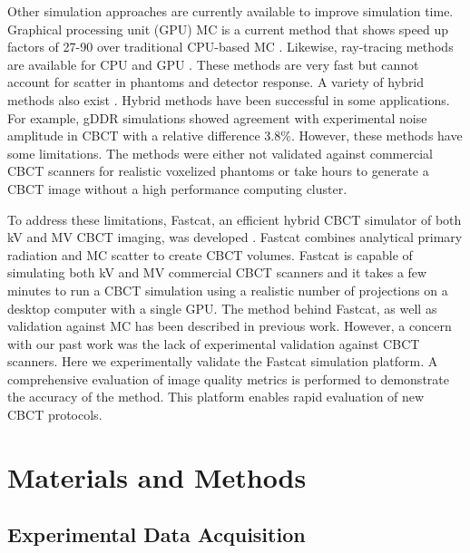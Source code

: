 Other simulation approaches are currently available to improve simulation time. Graphical processing unit (GPU) MC is a current method that shows speed up factors of 27-90 over traditional CPU-based MC \cite{Bert2013Geant4-basedApplications,Badal2009AcceleratingUnit}. Likewise, ray-tracing methods are available for CPU and GPU \cite{vanderHeyden2018VOXSI:Imaging,Landry2013ImaSimRadiology}. These methods are very fast but cannot account for scatter in phantoms and detector response. A variety of hybrid methods also exist \cite{Jia2012AProjections,DeMan2007CatSim:Environment,Li2008AImaging,Abadi2019DukeSim:Tomography}. Hybrid methods have been successful in some applications. For example, gDDR simulations \cite{Jia2012AProjections} showed agreement with experimental noise amplitude in CBCT with a relative difference 3.8\%. However, these methods have some limitations. The methods were either not validated against commercial CBCT scanners for realistic voxelized phantoms or take hours to generate a CBCT image without a high performance computing cluster.

To address these limitations, Fastcat, an efficient hybrid CBCT simulator of both kV and MV CBCT imaging, was developed \cite{OConnell2021FastCAT:Simulation}. Fastcat combines analytical primary radiation and MC scatter to create CBCT volumes. Fastcat is capable of simulating both kV and MV commercial CBCT scanners and it takes a few minutes to run a CBCT simulation using a realistic number of projections on a desktop computer with a single GPU. The method behind Fastcat, as well as validation against MC has been described in previous work\cite{OConnell2021FastCAT:Simulation}. However, a concern with our past work was the lack of experimental validation against CBCT scanners. Here we experimentally validate the Fastcat simulation platform. A comprehensive evaluation of image quality metrics is performed to demonstrate the accuracy of the method. This platform enables rapid evaluation of new CBCT protocols.

\section{Materials and Methods}

\subsection{Experimental Data Acquisition}

